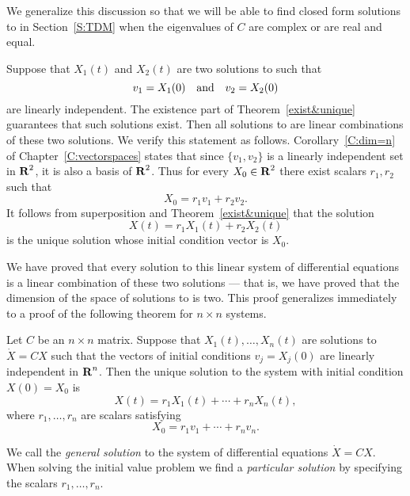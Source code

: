 We generalize this discussion so that we will be able to find closed form 
solutions to  in Section~\ref{S:TDM} when the eigenvalues 
of $C$ are complex or are real and equal.

Suppose that $X_1(t)$ and $X_2(t)$ are two solutions to  such
that
\[
v_1=X_1(0) \quad\mbox{and}\quad v_2=X_2(0)
\]
are linearly independent.  The existence part of
Theorem~\ref{exist&unique}
guarantees that such solutions exist.  Then all solutions to 
are linear combinations of these two solutions.  We verify this statement as
follows.  Corollary~\ref{C:dim=n} of Chapter~\ref{C:vectorspaces} states
that since $\{v_1,v_2\}$ is a linearly independent set in $\mbox{$\bf{R}$}^2$, it is
also a basis of $\mbox{$\bf{R}$}^2$.  Thus for every $X_0\in\mbox{$\bf{R}$}^2$ there exist scalars
$r_1,r_2$ such that
\[
X_0 = r_1v_1 + r_2v_2.
\]
It follows from superposition and Theorem~\ref{exist&unique} that the
solution
\[
X(t) = r_1X_1(t) + r_2X_2(t)
\]
is the unique solution whose initial condition vector is $X_0$.

We have proved that every solution to this linear system of differential
equations is a linear combination of these two solutions --- that is, we
have proved that the dimension of the space of solutions to 
is two.  This proof generalizes immediately to a proof of the following
theorem for $n\times n$ systems.

\begin{thm}  \label{T:solvends}
Let $C$ be an $n\times n$ matrix.  Suppose that $X_1(t),\ldots,X_n(t)$
are  solutions to $\dot{X}=CX$ such that the vectors of initial conditions
$v_j=X_j(0)$ are linearly independent in $\mbox{$\bf{R}$}^n$.  Then the unique solution
to the system  with initial condition $X(0)=X_0$ is
\begin{equation}  \label{E:genlsoln}
X(t)=r_1X_1(t) + \cdots + r_nX_n(t),
\end{equation}
where $r_1,\ldots,r_n$ are scalars satisfying
\begin{equation} \label{findscalars}
X_0 = r_1v_1 + \cdots + r_nv_n.
\end{equation}
\end{thm}

We call  the {\em general solution\/} 
to the system of differential equations $\dot{X}=CX$.  When solving the
initial value problem we find a {\em particular solution\/}
by specifying the scalars $r_1,\ldots,r_n$.

